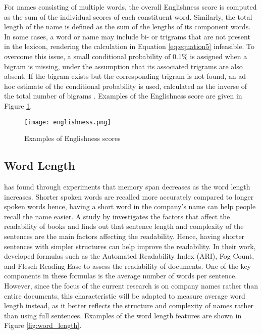\documentclass[a4paper,11pt]{report}
\begin{document}
For names consisting of multiple words, the overall Englishness score is computed as the sum of the individual scores of each constituent word. Similarly, the total length of the name is defined as the sum of the lengths of its component words. In some cases, a word or name may include bi- or trigrams that are not present in the lexicon, rendering the calculation in Equation \ref{eq:equation5} infeasible. To overcome this issue, a small conditional probability of 0.1\% is assigned when a bigram is missing, under the assumption that its associated trigrams are also absent. If the bigram exists but the corresponding trigram is not found, an ad hoc estimate of the conditional probability is used, calculated as the inverse of the total number of bigrams \cite{bigram_ref}. Examples of the Englishness score are given in Figure \ref{fig:englishness_score}. 

\begin{figure}[h!]
    \centering
    \texttt{[image: englishness.png]}
    \caption{Examples of Englishness scores}
    \label{fig:englishness_score}
\end{figure}

\subsection{Word Length}

 has found through experiments that memory span decreases as the word length increases. Shorter spoken words are recalled more accurately compared to longer spoken words hence, having a short word in the company's name can help people recall the name easier. A study by  investigates the factors that affect the readability of books and finds out that sentence length and complexity of the sentences are the main factors affecting the readability. Hence, having shorter sentences with simpler structures can help improve the readability. In their work,  developed formulas such as the Automated Readability Index (ARI), Fog Count, and Flesch Reading Ease to assess the readability of documents. One of the key components in these formulas is the average number of words per sentence. However, since the focus of the current research is on company names rather than entire documents, this characteristic will be adapted to measure average word length instead, as it better reflects the structure and complexity of names rather than using full sentences. Examples of the word length features are shown in Figure \ref{fig:word_length}.
\end{document}
